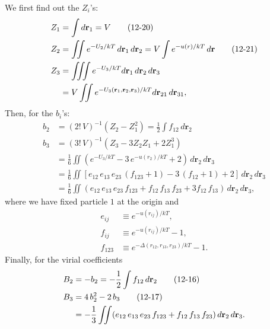 \documentclass[twocolumn, 10pt]{article}
\numberwithin{equation}{section}
\newenvironment{solution}[1][\empty]
{\par\medskip\sffamily
  \textbf{\ifx\empty#1{Solution.}\relax\else{#1}\fi} \ignorespaces}
{\medskip}
\begin{document}
\begin{solution}
  We first find out the $Z_i$'s:
  \begin{align}
    Z_1 &= \int d\mathbf r_1 = V
    \tag{12-20} \\
    Z_2 &= \iint e^{-U_2/kT} \, d\mathbf r_1 \, d\mathbf r_2
    = V \int e^{-u(r)/kT} \, d\mathbf r
    \tag{12-21} \\
    Z_3 &= \iiint e^{-U_3/kT} d\mathbf r_1 \, d\mathbf r_2 \, d\mathbf r_3
    \notag \\
    &=
    V \iint e^{-U_3(\mathbf r_1, \mathbf r_2, \mathbf r_3)/kT}
    d\mathbf r_{21} \, d\mathbf r_{31}
    ,
    \notag
  \end{align}
  Then, for the $b_i$'s:
  \begin{align*}
    b_2 &= (2! \, V)^{-1} (Z_2 -Z_1^2)
    = \frac{1}{2} \int f_{12} \, d\mathbf r_2
    \\
    b_3 &= (3! \, V)^{-1}(Z_3 - 3 Z_2 Z_1 +2 Z_1^3)
    \\
    &=
    \frac{1}{6} \iint
    (e^{-U_3/kT} -3 \, e^{-u(r_2)/kT} + 2)
    \, d\mathbf r_2 \, d\mathbf r_3
    \\
    &=
    \frac{1}{6} \iint
    [e_{12} \, e_{13} \, e_{23} \, (f_{123} + 1)
    - 3 \, (f_{12} + 1) + 2]
    \, d\mathbf r_2 \, d\mathbf r_3
    \\
    &=
    \frac{1}{6} \iint
    (e_{12} \, e_{13} \, e_{23} \, f_{123}
     + f_{12} \, f_{13} \, f_{23}
     + 3 f_{12} \, f_{13})
    \, d\mathbf r_2 \, d\mathbf r_3
    ,
  \end{align*}
  where we have fixed particle $1$ at the origin and
  \begin{align*}
    e_{ij} &\equiv e^{-u(r_{ij})/kT}, \\
    f_{ij} &\equiv e^{-u(r_{ij})/kT} - 1, \\
    f_{123} &\equiv e^{-\Delta(r_{12}, r_{13}, r_{23})/kT} - 1.
  \end{align*}
  Finally, for the virial coefficients
  \begin{align}
    B_2 &= -b_2
    = -\frac{1}{2} \int f_{12} \, d\mathbf r_2
    \tag{12-16}
    \\
    B_3
    &=
    4 \, b_2^2 - 2 \, b_3
    \tag{12-17}
    \\
    &=
    -\frac{1}{3} \iint
    (e_{12} \, e_{13} \, e_{23} \, f_{123}
     + f_{12} \, f_{13} \, f_{23})
    \, d\mathbf r_2 \, d\mathbf r_3
    .
    \notag
  \end{align}
\end{solution}
\end{document}
